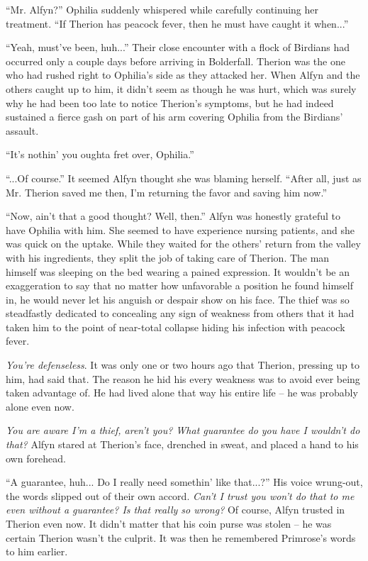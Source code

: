 ``Mr. Alfyn?'' Ophilia suddenly whispered while carefully continuing her treatment. ``If Therion has peacock fever, then he must have caught it when...''

``Yeah, must've been, huh...'' Their close encounter with a flock of Birdians had occurred only a couple days before arriving in Bolderfall. Therion was the one who had rushed right to Ophilia's side as they attacked her. When Alfyn and the others caught up to him, it didn't seem as though he was hurt, which was surely why he had been too late to notice Therion's symptoms, but he had indeed sustained a fierce gash on part of his arm covering Ophilia from the Birdians' assault. 

``It's nothin' you oughta fret over, Ophilia.''

``...Of course.'' It seemed Alfyn thought she was blaming herself. ``After all, just as Mr. Therion saved me then, I'm returning the favor and saving him now.''

``Now, ain't that a good thought? Well, then.'' Alfyn was honestly grateful to have Ophilia with him. She seemed to have experience nursing patients, and she was quick on the uptake. While they waited for the others' return from the valley with his ingredients, they split the job of taking care of Therion. The man himself was sleeping on the bed wearing a pained expression. It wouldn't be an exaggeration to say that no matter how unfavorable a position he found himself in, he would never let his anguish or despair show on his face. The thief was so steadfastly dedicated to concealing any sign of weakness from others that it had taken him to the point of near-total collapse hiding his infection with peacock fever.

\emph{You're defenseless}. It was only one or two hours ago that Therion, pressing up to him, had said that. The reason he hid his every weakness was to avoid ever being taken advantage of. He had lived alone that way his entire life -- he was probably alone even now.

\emph{You are aware I'm a thief, aren't you? What guarantee do you have I wouldn't do that?} Alfyn stared at Therion's face, drenched in sweat, and placed a hand to his own forehead.

``A guarantee, huh... Do I really need somethin' like that...?'' His voice wrung-out, the words slipped out of their own accord. \emph{Can't I trust you won't do that to me even without a guarantee? Is that really so wrong?} Of course, Alfyn trusted in Therion even now. It didn't matter that his coin purse was stolen -- he was certain Therion wasn't the culprit. It was then he remembered Primrose's words to him earlier.

